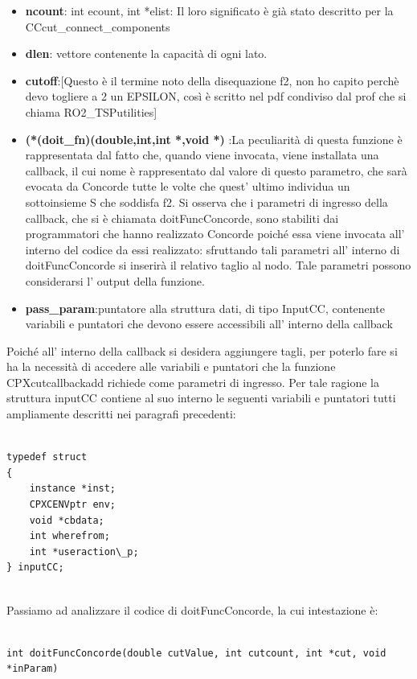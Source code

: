 \documentclass[11pt]{article}
\begin{document}
\begin{itemize}
	\item \textbf{ncount}: int ecount, int *elist: Il loro significato è già stato descritto per la CCcut\_connect\_components
	\item \textbf{dlen}: vettore contenente la capacità di ogni lato. 
	\item \textbf{cutoff}:[Questo è il termine noto della disequazione f2, non ho capito perchè devo togliere a 2 un EPSILON, così è scritto nel pdf condiviso dal prof che si chiama 		RO2\_TSPutilities]
	\item \textbf{(*(doit\_fn)(double,int,int *,void *) }:La peculiarità di questa funzione è rappresentata dal fatto che, quando viene invocata, viene installata una callback, il cui nome è rappresentato dal valore di questo parametro, che sarà evocata da Concorde tutte le volte che quest' ultimo individua un sottoinsieme S che soddisfa f2. Si osserva che i parametri di ingresso della callback, che si è chiamata doitFuncConcorde, sono stabiliti dai programmatori che hanno realizzato Concorde poiché essa viene invocata all' interno del codice da essi realizzato: sfruttando tali parametri all' interno di doitFuncConcorde si inserirà il relativo taglio al nodo. Tale parametri possono considerarsi l' output della funzione.
	\item \textbf{pass\_param}:puntatore alla struttura dati, di tipo InputCC, contenente variabili e puntatori che devono essere accessibili all’ interno della callback 
\end{itemize}

Poiché all' interno della callback si desidera aggiungere tagli, per poterlo fare si ha la necessità di accedere alle variabili e puntatori che la funzione CPXcutcallbackadd richiede come parametri di ingresso. Per tale ragione la struttura inputCC contiene al suo interno le seguenti variabili e puntatori tutti ampliamente descritti nei paragrafi precedenti:

\begin{lstlisting}

typedef struct 
{ 
	instance *inst;
	CPXCENVptr env;
	void *cbdata;
	int wherefrom;
	int *useraction\_p;
} inputCC;


\end{lstlisting}


Passiamo ad analizzare il codice di doitFuncConcorde, la cui intestazione è:

\begin{lstlisting}

int doitFuncConcorde(double cutValue, int cutcount, int *cut, void *inParam)

\end{lstlisting}
\end{document}
